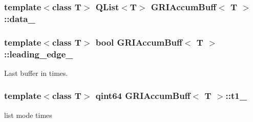 \hypertarget{classGRIAccumBuff_a62ce6b1368c96c9bbb8db231415dfa17}{
\subsubsection[{data\-\_\-}]{\setlength{\rightskip}{0pt plus 5cm}template$<$class \-T$>$ \-Q\-List$<$\-T$>$ {\bf \-G\-R\-I\-Accum\-Buff}$<$ \-T $>$\-::{\bf data\-\_\-}}}\label{classGRIAccumBuff_a62ce6b1368c96c9bbb8db231415dfa17}
\hypertarget{classGRIAccumBuff_af912c9fd29f623504187448efab863a4}{
\subsubsection[{leading\-\_\-edge\-\_\-}]{\setlength{\rightskip}{0pt plus 5cm}template$<$class \-T$>$ bool {\bf \-G\-R\-I\-Accum\-Buff}$<$ \-T $>$\-::{\bf leading\-\_\-edge\-\_\-}}}\label{classGRIAccumBuff_af912c9fd29f623504187448efab863a4}


\-Last buffer in times. 

\hypertarget{classGRIAccumBuff_a178faa42c9310620855e01ded9346071}{
\subsubsection[{t1\-\_\-}]{\setlength{\rightskip}{0pt plus 5cm}template$<$class \-T$>$ qint64 {\bf \-G\-R\-I\-Accum\-Buff}$<$ \-T $>$\-::{\bf t1\-\_\-}}}\label{classGRIAccumBuff_a178faa42c9310620855e01ded9346071}


list mode times 

